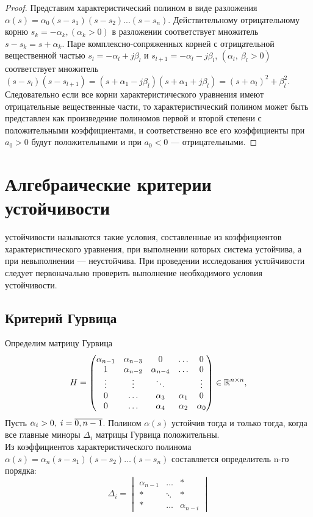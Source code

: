 \documentclass[../../TAU.tex]{subfiles}
\begin{document}
    \begin{proof}
        Представим характеристический полином в виде разложения
        $\alpha(s)=\alpha_0(s-s_1) (s-s_2) ... (s-s_n)$.
        Действительному отрицательному корню
        $s_k = -\alpha_k, (\alpha_k>0)$
        в разложении соответствует множитель
        $s - s_k=s+\alpha_k$.
        Паре комплексно-сопряженных корней с отрицательной вещественной частью 
        $s_l=-\alpha_l+j \beta_l$ 
        и 
        $s_{l+1}=-\alpha_l-j \beta_l$, 
        $(\alpha_l,\ \beta_l > 0)$ 
        соответствует множитель 
        $(s-s_l) (s-s_{l+1}) = (s+\alpha_1 - j \beta_l) (s+\alpha_1 + j \beta_l) = (s+\alpha_l)^2+\beta_l^2$.
        Следовательно если все корни характеристического уравнения имеют отрицательные вещественные части, то характеристический полином может быть представлен как произведение полиномов первой и второй степени с положительными коэффициентами, и соответственно все его коэффициенты при 
        $a_0>0$ будут положительными и при 
        $a_0<0$ --- отрицательными.
    \end{proof}

\section{Алгебраические критерии устойчивости}

     устойчивости называются такие  условия, составленные из коэффициентов характеристического уравнения, при выполнении которых система устойчива, а при невыполнении --- неустойчива. При проведении исследования устойчивости следует первоначально проверить выполнение необходимого условия устойчивости.

\subsection{Критерий Гурвица}

    Определим матрицу Гурвица
    $$
        H =\begin{pmatrix}
            \alpha_{n-1} & \alpha_{n-3} & 0 & \ldots & 0 \\
            1 & \alpha_{n-2} & \alpha_{n-4} & \ldots & 0 \\
            \vdots & \vdots & \ddots && \vdots \\
            0 & \ldots & \alpha_{3} & \alpha_1 & 0 \\
            0 & \ldots & \alpha_4 & \alpha_2 & \alpha_0
        \end{pmatrix}\in\mathbb{R}^{n\times n},
    $$
    \theor[Гурвица] Пусть 
    $\alpha_i>0,\; i=\overline{0,n-1}$.
    Полином $\alpha(s)$ устойчив тогда и только тогда, когда все главные миноры $\Delta_i$ матрицы Гурвица положительны. \\
    Из коэффициентов характеристического полинома 
    $\alpha(s)=\alpha_n(s-s_1) (s-s_2)\dots(s-s_n)$
    составляется определитель n-го порядка:
    $$
        \Delta_i =
        \begin{vmatrix}
            \alpha_{n-1}& \ldots& *\\
            *& \ddots & *\\
            *& \ldots & \alpha_{n-i}
        \end{vmatrix}
    $$
\end{document}
